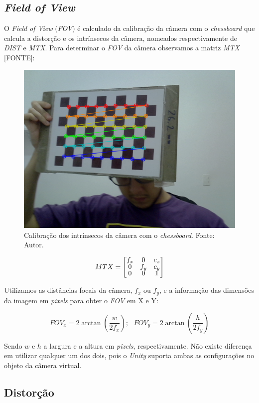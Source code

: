 \subsection{\textit{Field of View}}

O \textit{Field of View} (\textit{FOV}) é calculado da calibração da câmera com o \textit{chessboard} que calcula a distorção e os intrínsecos da câmera, nomeados respectivamente de \textit{DIST} e \textit{MTX}. Para determinar o \textit{FOV} da câmera observamos a matriz \textit{MTX} [FONTE]:

\begin{figure}[ht]
    \centering
    \includegraphics[width=.45\linewidth]{figuras/chessboard.png}
    \caption{Calibração dos intrínsecos da câmera com o \textit{chessboard}. Fonte: Autor.}
    \label{fig:chess_calib}
\end{figure}

\[ MTX = 
\renewcommand\arraystretch{.8}
\begin{bmatrix}
    f_x & 0 & c_x \\
    0 & f_y & c_y \\
    0 & 0 & 1
\end{bmatrix} \]

Utilizamos as distâncias focais da câmera, \(f_x\) ou \(f_y\), e a informação das dimensões da imagem em \textit{pixels} para obter o \textit{FOV} em X e Y: 

\[
FOV_x = 2 \arctan \left( \dfrac{w}{2f_x} \right) ;
\ \ \ FOV_y = 2 \arctan \left( \dfrac{h}{2f_y} \right) 
\]
    
Sendo \(w\) e \(h\) a largura e a altura em \textit{pixels}, respectivamente. Não existe diferença em utilizar qualquer um dos dois, pois o \textit{Unity} suporta ambas as configurações no objeto da câmera virtual.
    
\subsection{Distorção}

